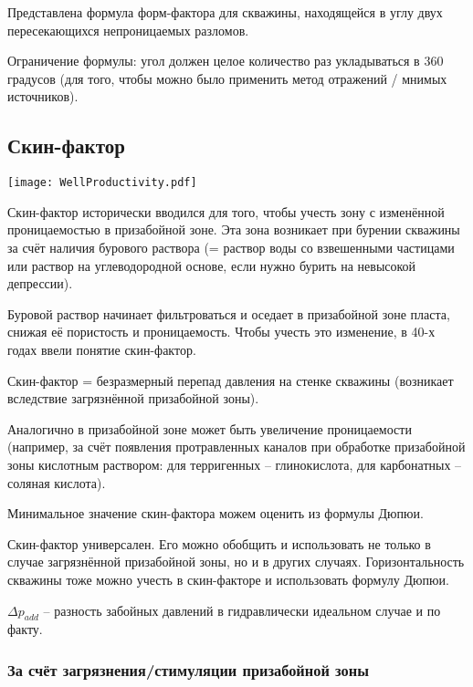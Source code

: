 \documentclass[main.tex]{subfiles}
\begin{document}
Представлена формула форм-фактора для скважины, находящейся в углу двух пересекающихся непроницаемых разломов.

Ограничение формулы: угол должен целое количество раз укладываться в 360 градусов (для того, чтобы можно было применить метод отражений / мнимых источников).

\subsection{Скин-фактор}

\texttt{[image: WellProductivity.pdf]}

Скин-фактор исторически вводился для того, чтобы учесть зону с изменённой проницаемостью в призабойной зоне. Эта зона возникает при бурении скважины за счёт наличия бурового раствора (= раствор воды со взвешенными частицами или раствор на углеводородной основе, если нужно бурить на невысокой депрессии).

Буровой раствор начинает фильтроваться и оседает в призабойной зоне пласта, снижая её пористость и проницаемость. Чтобы учесть это изменение, в 40-х годах ввели понятие скин-фактор.

Скин-фактор = безразмерный перепад давления на стенке скважины (возникает вследствие загрязнённой призабойной зоны).

Аналогично в призабойной зоне может быть увеличение проницаемости (например, за счёт появления протравленных каналов при обработке призабойной зоны кислотным раствором: для терригенных  -- глинокислота, для карбонатных -- соляная кислота).

Минимальное значение скин-фактора можем оценить из формулы Дюпюи.


Скин-фактор универсален. Его можно обобщить и использовать не только в случае загрязнённой призабойной зоны, но и в других случаях. Горизонтальность скважины тоже можно учесть в скин-факторе и использовать формулу Дюпюи.

$\Delta p_{add}$ -- разность забойных давлений в гидравлически идеальном случае и по факту.

\subsubsection{За счёт загрязнения/стимуляции призабойной зоны}
\end{document}
